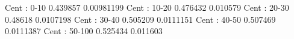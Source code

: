 Cent : 0-10
0.439857 0.00981199
Cent : 10-20
0.476432 0.010579
Cent : 20-30
0.48618 0.0107198
Cent : 30-40
0.505209 0.0111151
Cent : 40-50
0.507469 0.0111387
Cent : 50-100
0.525434 0.011603

